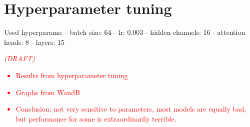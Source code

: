 \documentclass[english, 12pt, a4paper, sci, utf8, a-2b, online]{aaltothesis}
\newcommand{\draft}[1]{\textcolor{red}{\em (DRAFT) #1}}
\begin{document}
 
%  



\clearpage
\thesisappendix

\section{Hyperparameter tuning}
\label{app:hyperparams}
Used hyperparams:
- batch size: 64
- lr: 0.003
- hidden channels: 16
- attention heads: 8
- layers: 15


\draft{
    \begin{itemize}
        \item Results from hyperparameter tuning
        \item Graphs from WandB
        \item Conclusion: not very sensitive to parameters, most models are equally bad, but performance for some is extraordinarily terrible.
    \end{itemize}
}
\end{document}
